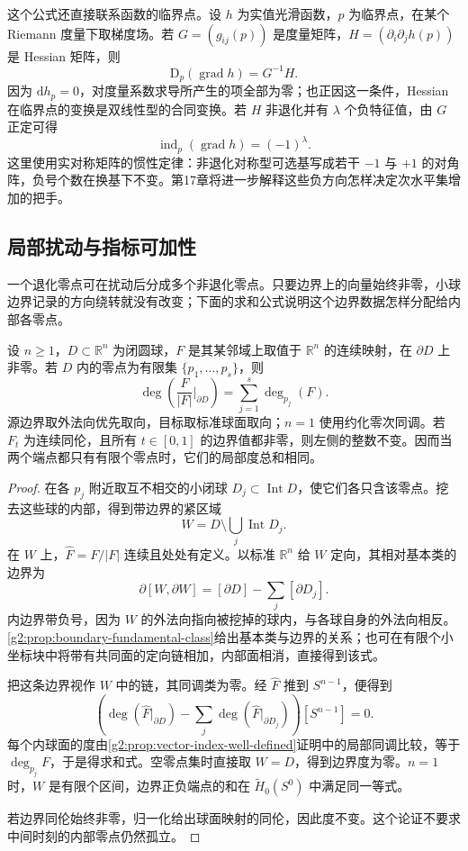 这个公式还直接联系函数的临界点。设 \(h\) 为实值光滑函数，\(p\) 为临界点，在某个 Riemann 度量下取梯度场。若 \(G=(g_{ij}(p))\) 是度量矩阵，\(H=(\partial_i\partial_jh(p))\) 是 Hessian 矩阵，则
\[
	\mathrm D_p(\operatorname{grad}h)=G^{-1}H.
\]
因为 \(\mathrm dh_p=0\)，对度量系数求导所产生的项全部为零；也正因这一条件，Hessian 在临界点的变换是双线性型的合同变换。若 \(H\) 非退化并有 \(\lambda\) 个负特征值，由 \(G\) 正定可得
\begin{equation}\label{g2:eq:gradient-index-hessian}
	\operatorname{ind}_p(\operatorname{grad}h)=(-1)^\lambda.
\end{equation}
这里使用实对称矩阵的惯性定律：非退化对称型可选基写成若干 \(-1\) 与 \(+1\) 的对角阵，负号个数在换基下不变。第17章将进一步解释这些负方向怎样决定次水平集增加的把手。

\subsection{局部扰动与指标可加性}
\label{g2:subsec:1603:03}

一个退化零点可在扰动后分成多个非退化零点。只要边界上的向量始终非零，小球边界记录的方向绕转就没有改变；下面的求和公式说明这个边界数据怎样分配给内部各零点。

\begin{theorem}\label{g2:thm:local-index-additivity}
	设 \(n\ge1\)，\(D\subset\mathbb R^n\) 为闭圆球，\(F\) 是其某邻域上取值于 \(\mathbb R^n\) 的连续映射，在 \(\partial D\) 上非零。若 \(D\) 内的零点为有限集 \(\{p_1,\ldots,p_s\}\)，则
	\begin{equation}\label{g2:eq:local-index-sum}
		\deg\left(\frac{F}{|F|}\bigg|_{\partial D}\right)
		=\sum_{j=1}^s\deg_{p_j}(F).
	\end{equation}
	源边界取外法向优先取向，目标取标准球面取向；\(n=1\) 使用约化零次同调。若 \(F_t\) 为连续同伦，且所有 \(t\in[0,1]\) 的边界值都非零，则左侧的整数不变。因而当两个端点都只有有限个零点时，它们的局部度总和相同。
\end{theorem}
\begin{proof}
	在各 \(p_j\) 附近取互不相交的小闭球 \(D_j\subset\operatorname{Int}D\)，使它们各只含该零点。挖去这些球的内部，得到带边界的紧区域
	\[
		W=D\setminus\bigcup_j\operatorname{Int}D_j.
	\]
	在 \(W\) 上，\(\widehat F=F/|F|\) 连续且处处有定义。以标准 \(\mathbb R^n\) 给 \(W\) 定向，其相对基本类的边界为
	\[
		\partial[W,\partial W]=[\partial D]-\sum_j[\partial D_j].
	\]
	内边界带负号，因为 \(W\) 的外法向指向被挖掉的球内，与各球自身的外法向相反。\cref{g2:prop:boundary-fundamental-class}给出基本类与边界的关系；也可在有限个小坐标块中将带有共同面的定向链相加，内部面相消，直接得到该式。

	把这条边界视作 \(W\) 中的链，其同调类为零。经 \(\widehat F\) 推到 \(S^{n-1}\)，便得到
	\[
		\left(\deg(\widehat F|_{\partial D})-\sum_j\deg(\widehat F|_{\partial D_j})\right)[S^{n-1}]=0.
	\]
	每个内球面的度由\cref{g2:prop:vector-index-well-defined}证明中的局部同调比较，等于 \(\deg_{p_j}F\)，于是得求和式。空零点集时直接取 \(W=D\)，得到边界度为零。\(n=1\) 时，\(W\) 是有限个区间，边界正负端点的和在 \(\widetilde H_0(S^0)\) 中满足同一等式。

	若边界同伦始终非零，归一化给出球面映射的同伦，因此度不变。这个论证不要求中间时刻的内部零点仍然孤立。
\end{proof}

